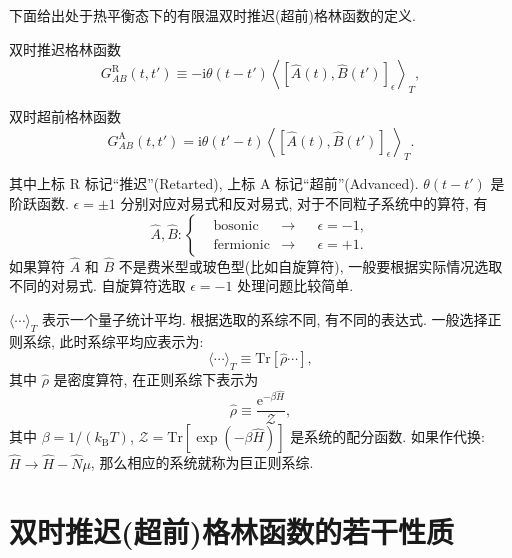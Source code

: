 下面给出处于热平衡态下的有限温双时推迟(超前)格林函数的定义. 
\begin{definition}{双时推迟格林函数}{}
    \begin{equation}
        G_{AB}^{\mathrm R}(t, t')\equiv -\mathrm{i}\theta(t-t')\left\langle \left[ \hat A(t), \hat B(t') \right]_\epsilon \right\rangle_T, 
    \end{equation}
\end{definition}
\begin{definition}{双时超前格林函数}{}
    \begin{equation}
        G_{AB}^{\mathrm{A}}(t,t')=\mathrm{i}\theta(t'-t)\left\langle \left[ \hat A(t), \hat B(t') \right]_\epsilon \right\rangle_T. 
    \end{equation}
\end{definition}
其中上标 $\mathrm R$ 标记“推迟”(Retarted), 上标 $\mathrm A$ 标记“超前”(Advanced). $\theta(t-t')$ 是阶跃函数. $\epsilon=\pm 1$ 分别对应对易式和反对易式, 对于不同粒子系统中的算符, 有
\begin{equation}
    \hat A,\hat B:\left\{\begin{aligned}
       & \mathrm{bosonic}&\longrightarrow&&\epsilon=-1,\\
        &\mathrm{fermionic}&\longrightarrow&&\epsilon=+1.
    \end{aligned}\right.
\end{equation}
如果算符 $\hat A$ 和 $\hat B$ 不是费米型或玻色型(比如自旋算符), 一般要根据实际情况选取不同的对易式. 自旋算符选取 $\epsilon=-1$ 处理问题比较简单.

$\langle\cdots\rangle_T$ 表示一个量子统计平均. 根据选取的系综不同, 有不同的表达式. 一般选择正则系综, 此时系综平均应表示为:
\begin{equation}
    \langle \cdots \rangle_T\equiv\mathrm{Tr}\left[ \hat\rho \cdots \right],
\end{equation}
其中 $\hat\rho$ 是密度算符, 在正则系综下表示为
\begin{equation}
    \hat\rho\equiv \frac{\mathrm{e}^{-\beta\hat H}}{\mathcal{Z} },
\end{equation}
其中 $\beta=1/(k_{\mathrm{B}}T)$, $\mathcal{Z}=\mathrm{Tr}\left[\exp(-\beta\hat H)\right]$ 是系统的配分函数. 如果作代换: $\hat H\to \hat H-\hat N\mu$, 那么相应的系统就称为巨正则系综.

\section{双时推迟(超前)格林函数的若干性质}
